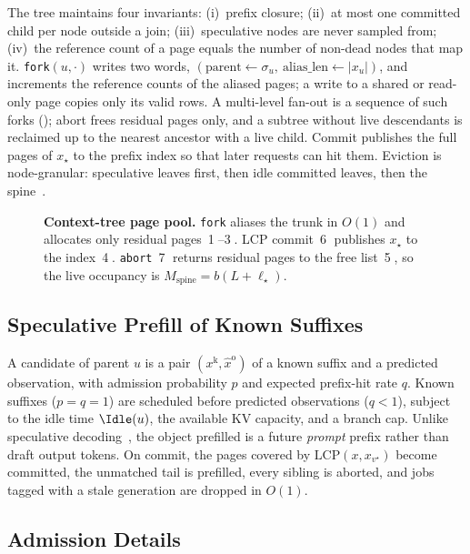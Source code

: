 The tree maintains four invariants: (i)~prefix closure; (ii)~at most one committed child per node outside a join; (iii)~speculative nodes are never sampled from; (iv)~the reference count of a page equals the number of non-dead nodes that map it.
\texttt{fork}$(u,\cdot)$ writes two words, $(\mathrm{parent}\leftarrow\sigma_u,\ \mathrm{alias\_len}\leftarrow|x_u|)$, and increments the reference counts of the aliased pages; a write to a shared or read-only page copies only its valid rows.
A multi-level fan-out is a sequence of such forks (); abort frees residual pages only, and a subtree without live descendants is reclaimed up to the nearest ancestor with a live child.
Commit publishes the full pages of $x_\star$ to the prefix index so that later requests can hit them.
Eviction is node-granular: speculative leaves first, then idle committed leaves, then the spine~\cite{continuum,mori}.

\begin{figure}[t]
\centering
\resizebox{\textwidth}{!}{}
\caption{\textbf{Context-tree page pool.}
\texttt{fork} aliases the trunk in $O(1)$ and allocates only residual pages~\textcircled{1}--\textcircled{3}.
LCP commit~\textcircled{6} publishes $x_\star$ to the index~\textcircled{4}.
\texttt{abort}~\textcircled{7} returns residual pages to the free list~\textcircled{5}, so the live occupancy is $M_{\mathrm{spine}}{=}b(L{+}\ell_\star)$.}
\label{fig:pool}
\end{figure}

\subsection{Speculative Prefill of Known Suffixes}
\label{sec:speculate}
A candidate of parent $u$ is a pair $(x^{\mathrm{k}},\hat{x}^{\mathrm{o}})$ of a known suffix and a predicted observation, with admission probability $p$ and expected prefix-hit rate $q$.
Known suffixes ($p{=}q{=}1$) are scheduled before predicted observations ($q{<}1$), subject to the idle time $\Idle(u)$, the available KV capacity, and a branch cap.
Unlike speculative decoding~\cite{speculative,medusa}, the object prefilled is a future \emph{prompt} prefix rather than draft output tokens.
On commit, the pages covered by $\mathrm{LCP}(x,x_{v^\star})$ become committed, the unmatched tail is prefilled, every sibling is aborted, and jobs tagged with a stale generation are dropped in $O(1)$.

\subsection{Admission Details}
\label{sec:app-detail}

